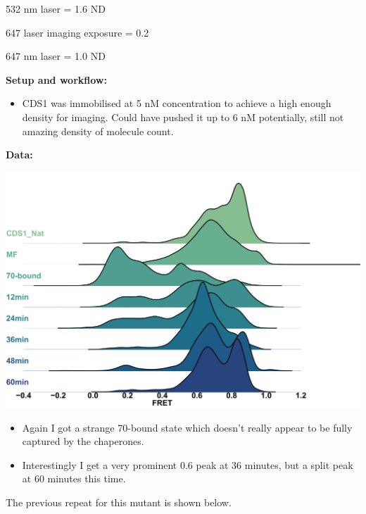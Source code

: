 \documentclass[
  letterpaper,
  DIV=11,
  numbers=noendperiod]{scrartcl}
\providecommand{\tightlist}{%
  \setlength{\itemsep}{0pt}\setlength{\parskip}{0pt}}\usepackage{longtable,booktabs,array}
\begin{document}
532 nm laser = 1.6 ND

647 laser imaging exposure = 0.2

647 nm laser = 1.0 ND

\textbf{Setup and workflow:}

\begin{itemize}
\tightlist
\item
  CDS1 was immobilised at 5 nM concentration to achieve a high enough
  density for imaging. Could have pushed it up to 6 nM potentially,
  still not amazing density of molecule count.
\end{itemize}

\textbf{Data:}

\includegraphics{Hist.png}

\begin{itemize}
\tightlist
\item
  Again I got a strange 70-bound state which doesn't really appear to be
  fully captured by the chaperones.
\item
  Interestingly I get a very prominent 0.6 peak at 36 minutes, but a
  split peak at 60 minutes this time.
\end{itemize}

The previous repeat for this mutant is shown below.
\end{document}
